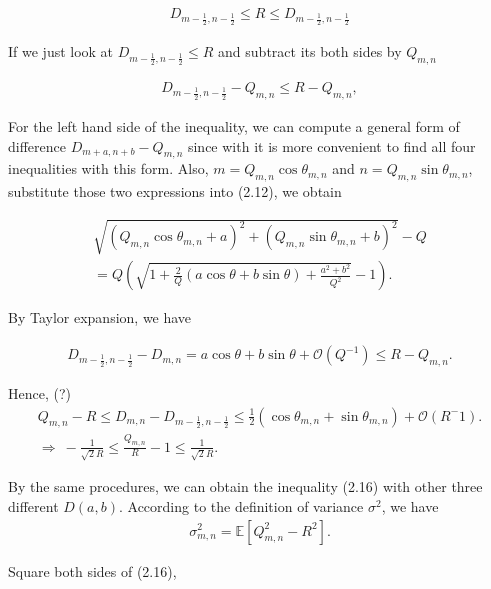 \documentclass[letterpaper]{article}
\numberwithin{equation}{section} %
\numberwithin{figure}{section} %
\numberwithin{table}{section} %
\begin{document}
\begin{align} 
D_{m-\frac{1}{2},n-\frac{1}{2}} \leq R \leq D_{m-\frac{1}{2},n-\frac{1}{2}}
\end{align}

\noindent
If we just look at $D_{m-\frac{1}{2},n-\frac{1}{2}} \leq R$ and subtract its both sides by $Q_{m,n}$

\begin{align} 
D_{m-\frac{1}{2},n-\frac{1}{2}} - Q_{m,n} \leq R- Q_{m,n},
\end{align}

\noindent
For the left hand side of the inequality, we can compute a general form of difference $D_{m+a,n+b} - Q_{m,n}$ since with it is more convenient to find all four inequalities with this form. Also, $m=Q_{m,n}\cos \theta_{m,n}$ and $n=Q_{m,n}\sin \theta_{m,n}$, substitute those two expressions into (2.12), we obtain

\begin{equation}
\begin{align} 
\sqrt{(Q_{m,n}\cos \theta_{m,n}+a)^2+(Q_{m,n}\sin \theta_{m,n} +b)^2}-Q \\
=Q(\sqrt{1+\frac{2}{Q}(a\cos \theta+b\sin \theta)+\frac{a^2+b^2}{Q^2}}-1).
\end{align}
\end{equation}

\noindent
By Taylor expansion, we have 

\begin{align} 
D_{m-\frac{1}{2}, n-\frac{1}{2}}-D_{m,n} = a\cos \theta +b\sin \theta + \mathcal{O}(Q^{-1}) \leq R-Q_{m,n}.
\end{align}

\noindent
Hence, (?)
\begin{align} 
Q_{m,n}-R \leq D_{m,n}-D_{m-\frac{1}{2},n-\frac{1}{2}} \leq \frac{1}{2}(\cos \theta_{m,n}+\sin \theta_{m,n})+\mathcal{O}(R^-1). \\
\Rightarrow \ -\frac{1}{\sqrt{2}R} \leq \frac{Q_{m,n}}{R}-1 \leq \frac{1}{\sqrt{2}R}.
\end{align}

\noindent 
By the same procedures, we can obtain the inequality (2.16) with other three different $D(a,b)$. According to the definition of variance $\sigma^2$, we have 
\begin{align} 
\sigma_{m,n}^2 = \mathbb{E}[Q_{m,n}^2-R^2].
\end{align}

\noindent
Square both sides of (2.16),
\end{document}
